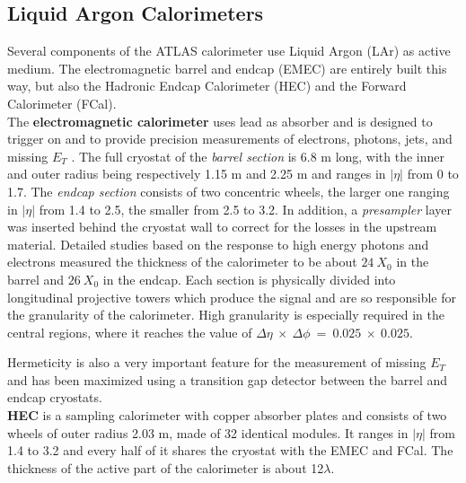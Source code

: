 \documentclass[a4paper,twoside,12pt]{book}
\begin{document}
\subsection*{Liquid Argon Calorimeters}\label{sec:LAr}
Several components of the ATLAS calorimeter use Liquid Argon (LAr) as active medium\cite{current_EMCal}. The electromagnetic barrel and endcap (EMEC) are entirely built this way, but also the Hadronic Endcap Calorimeter (HEC) and the Forward Calorimeter (FCal). \\[2pt]
The \textbf{electromagnetic calorimeter} uses lead as absorber and is designed to trigger on and to provide precision measurements of electrons, photons, jets, and missing $E_T$ .
The full cryostat of the \textit{barrel section} is 6.8 m long, with the inner and outer radius being respectively 1.15 m and 2.25 m and ranges in $|\eta|$ from 0 to 1.7.  The \textit{endcap section} consists of two concentric wheels, the larger one ranging in $|\eta|$ from 1.4 to 2.5, the smaller from 2.5 to 3.2. In addition, a \textit{presampler} layer was inserted behind the cryostat wall to correct for the losses in the upstream material. 
Detailed studies based on the response to high energy photons and electrons
measured the thickness of the calorimeter to be about $24\ X_0$ in the barrel and $26\ X_0$ in the endcap. Each section is physically divided into longitudinal projective towers which produce the signal and are so responsible
for the granularity of the calorimeter.
High granularity is especially required in the central regions, where it reaches the value of 
$\Delta\eta\ \times\ \Delta\phi\ =\ 0.025\ \times\ 0.025$.

Hermeticity is also a very important feature for the measurement of missing $E_T$ and has been maximized using a transition gap detector between the barrel and endcap cryostats. \\

\textbf{HEC}\cite{hec} is a sampling calorimeter with copper absorber plates and consists of two wheels of outer radius 2.03 m, made of 32 identical modules. It ranges in $|\eta|$ from 1.4 to 3.2 and every half of it shares the cryostat with the EMEC and FCal. The thickness of the active part of the calorimeter is about 12$\lambda$.\\
\end{document}
